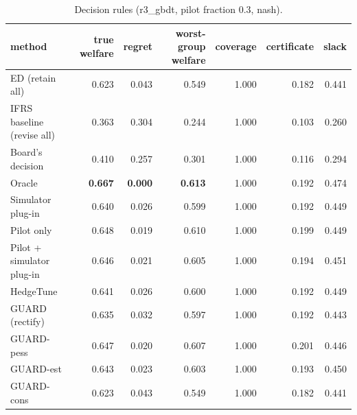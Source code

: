 \begin{table}[t]
\centering
\small
\begin{tabular}{lrrrrrr}
\toprule
method & true welfare & regret & worst-group welfare & coverage & certificate & slack \\
\midrule
ED (retain all) & 0.623 & 0.043 & 0.549 & 1.000 & 0.182 & 0.441 \\
IFRS baseline (revise all) & 0.363 & 0.304 & 0.244 & 1.000 & 0.103 & 0.260 \\
Board's decision & 0.410 & 0.257 & 0.301 & 1.000 & 0.116 & 0.294 \\
Oracle & \textbf{0.667} & \textbf{0.000} & \textbf{0.613} & 1.000 & 0.192 & 0.474 \\
Simulator plug-in & 0.640 & 0.026 & 0.599 & 1.000 & 0.192 & 0.449 \\
Pilot only & 0.648 & 0.019 & 0.610 & 1.000 & 0.199 & 0.449 \\
Pilot + simulator plug-in & 0.646 & 0.021 & 0.605 & 1.000 & 0.194 & 0.451 \\
HedgeTune & 0.641 & 0.026 & 0.600 & 1.000 & 0.192 & 0.449 \\
GUARD (rectify) & 0.635 & 0.032 & 0.597 & 1.000 & 0.192 & 0.443 \\
GUARD-pess & 0.647 & 0.020 & 0.607 & 1.000 & 0.201 & 0.446 \\
GUARD-est & 0.643 & 0.023 & 0.603 & 1.000 & 0.193 & 0.450 \\
GUARD-cons & 0.623 & 0.043 & 0.549 & 1.000 & 0.182 & 0.441 \\
\bottomrule
\end{tabular}
\caption{Decision rules (r3\_gbdt, pilot fraction 0.3, nash).}
\label{tab:methods-nash}
\end{table}
